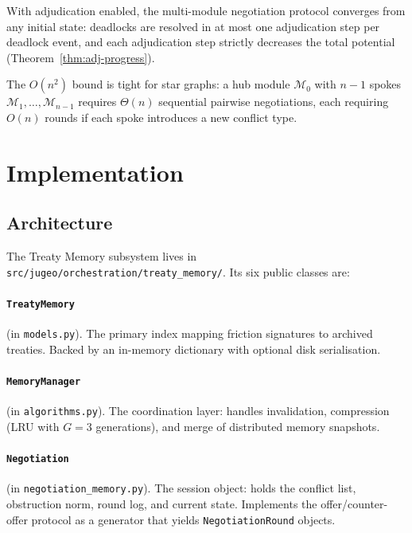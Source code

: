 \documentclass[11pt]{article}
\newcommand{\Mod}{\mathcal{M}}            %
\begin{document}
\begin{corollary}\label{cor:deadlock-free}
With adjudication enabled, the multi-module negotiation protocol
converges from any initial state: deadlocks are resolved in at most
one adjudication step per deadlock event, and each adjudication
step strictly decreases the total potential (Theorem~\ref{thm:adj-progress}).
\end{corollary}

\begin{remark}
The $O(n^2)$ bound is tight for star graphs: a hub module $\Mod_0$
with $n-1$ spokes $\Mod_1, \ldots, \Mod_{n-1}$ requires
$\Theta(n)$ sequential pairwise negotiations, each requiring $O(n)$
rounds if each spoke introduces a new conflict type.
\end{remark}

\section{Implementation}\label{sec:impl}

\subsection{Architecture}

The Treaty Memory subsystem lives in
\texttt{src/jugeo/orchestration/treaty\_memory/}.  Its six public
classes are:

\paragraph{\texttt{TreatyMemory}} (in \texttt{models.py}).
The primary index mapping friction signatures to archived treaties.
Backed by an in-memory dictionary with optional disk serialisation.

\paragraph{\texttt{MemoryManager}} (in \texttt{algorithms.py}).
The coordination layer: handles invalidation, compression (LRU with
$G = 3$ generations), and merge of distributed memory snapshots.

\paragraph{\texttt{Negotiation}} (in \texttt{negotiation\_memory.py}).
The session object: holds the conflict list, obstruction norm, round
log, and current state.  Implements the offer/counter-offer protocol
as a generator that yields \texttt{NegotiationRound} objects.
\end{document}
